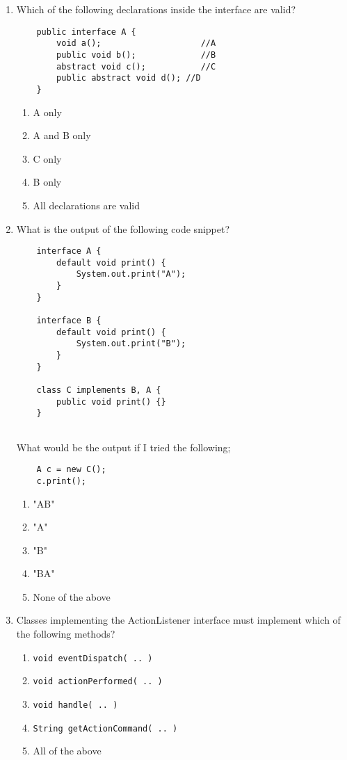 \documentclass[S17-Final.tex]{subfiles}
\begin{document}
\begin{enumerate}
\item Which of the following declarations inside the interface are valid?
\begin{lstlisting}
    public interface A {
        void a();                    //A
        public void b();             //B
        abstract void c();           //C
        public abstract void d(); //D
    }
\end{lstlisting}
	
\begin{enumerate}
\item  A only
\item  A and B only
\item  C only
\item  B only
\item  All declarations are valid
\end{enumerate}
\clearpage
\item What is the output of the following code snippet?
\begin{lstlisting}
    interface A {
        default void print() {
            System.out.print("A");
        }
    }

    interface B {
        default void print() {
            System.out.print("B");
        }
    }
    
    class C implements B, A {
        public void print() {}
    }
 
\end{lstlisting}
What would be the output if I tried the following;
\begin{lstlisting}
    A c = new C();
    c.print();
\end{lstlisting}
\begin{enumerate}
\item  "AB"
\item  "A"
\item  "B"
\item  "BA"
\item  None of the above 
\end{enumerate}

\item Classes implementing the ActionListener interface must implement which of the following methods?

\begin{enumerate}
\item  \texttt{void eventDispatch( .. )}
\item  \texttt{void actionPerformed( .. )}
\item  \texttt{void handle( .. )}
\item  \texttt{String getActionCommand( .. )}
\item  All of the above
\end{enumerate}
\clearpage


\end{enumerate}
\end{document}
